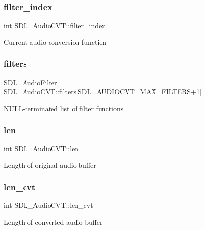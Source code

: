 \subsubsection{\texorpdfstring{filter\_index}{filter\_index}}
{\footnotesize\ttfamily int S\+D\+L\+\_\+\+Audio\+C\+V\+T\+::filter\+\_\+index}

Current audio conversion function \mbox{\label{struct_s_d_l___audio_c_v_t_afeb8dc60716644de3b681653442de1db}} 
\subsubsection{\texorpdfstring{filters}{filters}}
{\footnotesize\ttfamily S\+D\+L\+\_\+\+Audio\+Filter S\+D\+L\+\_\+\+Audio\+C\+V\+T\+::filters\mbox{[}\mbox{\hyperlink{_s_d_l__audio_8h_a3d38380ac4a45a68a0e1c1a7a02bd290}{S\+D\+L\+\_\+\+A\+U\+D\+I\+O\+C\+V\+T\+\_\+\+M\+A\+X\+\_\+\+F\+I\+L\+T\+E\+RS}}+1\mbox{]}}

N\+U\+L\+L-\/terminated list of filter functions \mbox{\label{struct_s_d_l___audio_c_v_t_aeaeb8c5a63c3ab96471fbfdf412c78ff}} 
\subsubsection{\texorpdfstring{len}{len}}
{\footnotesize\ttfamily int S\+D\+L\+\_\+\+Audio\+C\+V\+T\+::len}

Length of original audio buffer \mbox{\label{struct_s_d_l___audio_c_v_t_a5c60163f34d1947e5b166c23aba9879d}} 
\subsubsection{\texorpdfstring{len\_cvt}{len\_cvt}}
{\footnotesize\ttfamily int S\+D\+L\+\_\+\+Audio\+C\+V\+T\+::len\+\_\+cvt}

Length of converted audio buffer \mbox{\label{struct_s_d_l___audio_c_v_t_ac9662d47cf2348b82b27b151150116b0}} 
